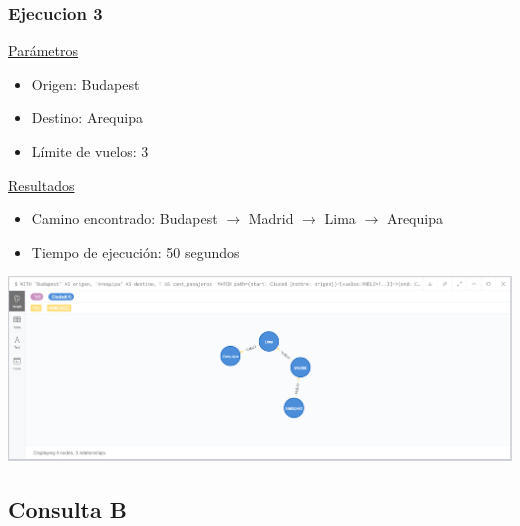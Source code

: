 \documentclass[a4paper,11pt]{article}
\begin{document}
\subsubsection*{Ejecucion 3}
\noindent
\underline{Parámetros}
\begin{itemize}
\item Origen: Budapest
\item Destino: Arequipa
\item Límite de vuelos: 3
\end{itemize}
\underline{Resultados}
\begin{itemize}
\item Camino encontrado: Budapest $\rightarrow$ Madrid $\rightarrow$ Lima $\rightarrow$ Arequipa
\item Tiempo de ejecución: 50 segundos
\end{itemize}
\begin{center}
\includegraphics[scale=0.40]{./imagenes/consultaA-ejec3.png}
\end{center}
\newpage
\subsection*{Consulta B}
\end{document}
